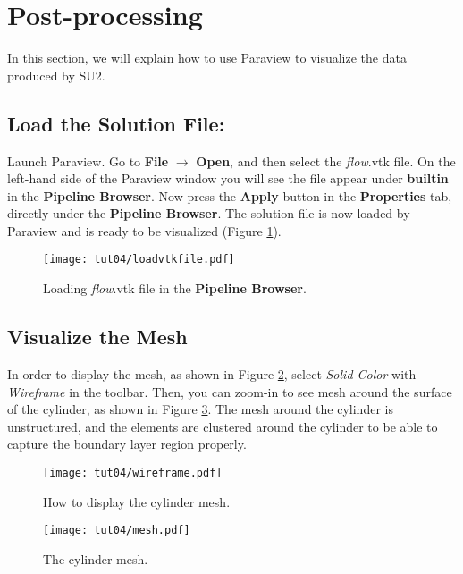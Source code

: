 \section{Post-processing}
In this section, we will explain how to use Paraview to visualize the data produced by SU2.
\subsection{Load the Solution File:}
Launch Paraview. Go to \textbf{File} $\rightarrow$ \textbf{Open}, and then select the \textit{flow}.vtk file. On the left-hand side of the Paraview window you will see the file appear under \textbf{builtin} in the \textbf{Pipeline Browser}. Now press the \textbf{Apply} button in the \textbf{Properties} tab, directly under the \textbf{Pipeline Browser}. The solution file is now loaded by Paraview and is ready to be visualized (Figure \ref{fig4:load}).
\begin{figure}[htbp]
    \centering
    \texttt{[image: tut04/loadvtkfile.pdf]}
    \caption{Loading \textit{flow}.vtk file in the \textbf{Pipeline Browser}.}
    \label{fig4:load}
\end{figure}
\subsection{Visualize the Mesh}
In order to display the mesh, as shown in Figure \ref{fig4:wireframe_4}, select \textit{Solid Color} with \textit{Wireframe} in the toolbar. Then, you can zoom-in to see mesh around the surface of the cylinder, as shown in Figure \ref{fig4:mesh_4}. The mesh around the cylinder is unstructured, and the elements are clustered around the cylinder to be able to capture the boundary layer region properly.
\begin{figure}[htbp]
    \centering
    \texttt{[image: tut04/wireframe.pdf]}
    \caption{How to display the cylinder mesh.}
    \label{fig4:wireframe_4}
\end{figure}
\begin{figure}[htbp]
    \centering
    \texttt{[image: tut04/mesh.pdf]}
    \caption{The cylinder mesh.}
    \label{fig4:mesh_4}
\end{figure}
